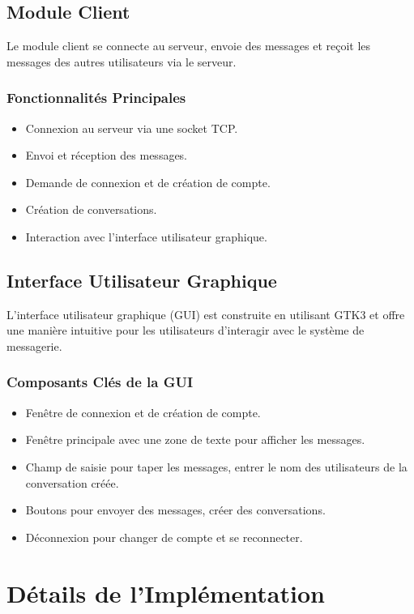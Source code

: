 \documentclass{article}
\begin{document}
\subsection{Module Client}
Le module client se connecte au serveur, envoie des messages et reçoit les messages des autres utilisateurs via le serveur.

\subsubsection{Fonctionnalités Principales}
\begin{itemize}
    \item Connexion au serveur via une socket TCP.
    \item Envoi et réception des messages.
    \item Demande de connexion et de création de compte.
    \item Création de conversations.
    \item Interaction avec l'interface utilisateur graphique.
\end{itemize}

\subsection{Interface Utilisateur Graphique}
L'interface utilisateur graphique (GUI) est construite en utilisant GTK3 et offre une manière intuitive pour les utilisateurs d'interagir avec le système de messagerie.

\subsubsection{Composants Clés de la GUI}
\begin{itemize}
   \item Fenêtre de connexion et de création de compte.
    \item Fenêtre principale avec une zone de texte pour afficher les messages.
    \item Champ de saisie pour taper les messages, entrer le nom des utilisateurs de la conversation créée.
    \item Boutons pour envoyer des messages, créer des conversations.
    \item Déconnexion pour changer de compte et se reconnecter.
\end{itemize}

\section{Détails de l'Implémentation}
\end{document}
